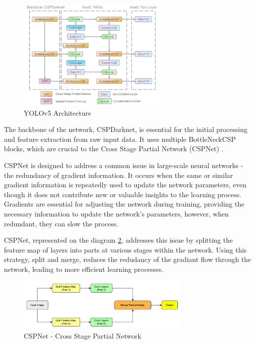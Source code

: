 \begin{figure}[h]
    \centering 
    \includegraphics[width=0.65\textwidth]{figs/yolov5-architecture2.png} 
    \caption{YOLOv5 Architecture \cite{rfc49}}
    \label{fig:yolov5-architecture}
\end{figure}

The backbone of the network, CSPDarknet, is essential for the initial processing and feature extraction from raw input data.
It uses multiple BottleNeckCSP blocks, which are crucial to the Cross Stage Partial Network (CSPNet) \cite{rfc49}.

CSPNet is designed to address a common issue in large-scale neural networks - the redundancy of gradient information. 
It occurs when the same or similar gradient information is repeatedly used to update the network parameters, even though it does not contribute
new or valuable insights to the learning process.
Gradients are essential for adjusting the network during training, providing the necessary information to update 
the network's parameters, however, when redundant, they can slow the process.

CSPNet, represented on the diagram \ref{fig:cspnet}, addresses this issue by splitting the feature map of layers 
into parts at various stages within the network.
Using this strategy, split and merge, reduces the redudancy of the gradiant flow
 through the network, leading to more efficient 
learning processes. 


\begin{figure}[h]
    \centering 
    \includegraphics[width=0.75\textwidth]{figs/spnet.png} 
    \caption{CSPNet - Cross Stage Partial Network}
    \label{fig:cspnet}
\end{figure}

